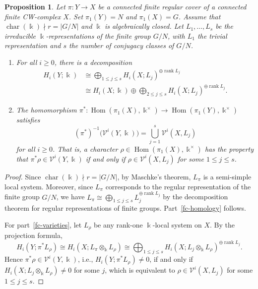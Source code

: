 \documentclass[11pt]{amsart}
\newtheorem{proposition}[theorem]{Proposition}
\theoremstyle{definition}
\renewcommand{\k}{\Bbbk}
\newcommand{\VV}{\mathcal{V}}
\DeclareMathOperator{\rank}{rank}
\DeclareMathOperator{\ch}{char}
\DeclareMathOperator{\Hom}{{Hom}}
\begin{document}
\begin{proposition} 
\label{prop:finite-cover}
Let $\pi\colon Y\to X$ be a connected finite regular cover of a connected 
finite CW-complex $X$. Set $\pi_1(Y)=N$ and $\pi_1(X)=G$.
Assume that $\ch(\k) \nmid r=\vert G/N \vert$ and $\k$ is algebraically closed. 
Let $L_1,\dots, L_s$ be the irreducible $\k$-representations of the 
finite group $G/N$, with $L_1$ the trivial representation and $s$ the 
number of conjugacy classes of $G/N$.
\begin{enumerate}[itemsep=3pt]
\item \label{fc-homology}
For all $i\ge 0$, there is a decomposition
\begin{equation}
\label{eq:decomp}
\begin{aligned}
H_i(Y;\k) & \cong \bigoplus_{1\leq j \leq s}  
H_i(X;L_j)^{\oplus \rank L_j} \\
& \cong H_i(X;\k) \oplus \bigoplus_{2\leq j \leq s}
H_i(X;L_j)^{\oplus \rank L_j}.
\end{aligned}
\end{equation}

\item \label{fc-varieties}
The homomorphism $\pi^* \colon \Hom(\pi_1(X),\k^{\times})\to 
\Hom(\pi_1(Y),\k^{\times})$ satisfies
\begin{equation}
\label{eq:pullback-cv}
(\pi^*)^{-1}\big(\VV^i(Y,\k)\big) 
= \bigcup_{j=1}^{s} \VV^i(X,L_j)
\end{equation}
for all $i\ge 0$. That is, a character 
$\rho\in \Hom(\pi_1(X),\k^{\times})$ has the property that 
$\pi^*\rho \in \VV^i(Y,\k)$ if and only if 
$\rho \in \VV^i(X,L_j)$ for some $1\le j\le s$.
\end{enumerate}
\end{proposition}

\begin{proof}
Since $\ch(\k) \nmid r=\vert G/N \vert$, by Maschke's theorem, 
$L_{\pi}$ is a semi-simple local system. 
Moreover, since $L_\pi$ corresponds to the regular representation 
of the finite group $G/N$, we have $L_\pi \cong 
\bigoplus_{1\leq j \leq s} L_j^{\oplus \rank L_j}$ by the 
decomposition theorem for regular representations of 
finite groups. Part~\eqref{fc-homology} follows.

For part~\eqref{fc-varieties}, let $L_\rho$ be any rank-one 
$\k$-local system on $X$. By the projection formula, 
\begin{equation}
\label{eq:proj-formula}
H_i(Y; \pi^*L_\rho) \cong H_i(X; L_\pi \otimes_\k L_\rho)
\cong \bigoplus_{1\leq j \leq s} 
H_i(X;L_j\otimes_\k L_\rho)^{\oplus \rank L_j}.
\end{equation}
Hence $\pi^*\rho \in \VV^i(Y,\k)$, i.e., 
$H_i(Y;\pi^*L_\rho)\ne 0$, if and only if 
$H_i(X;L_j\otimes_\k L_\rho)\ne 0$ for some $j$, 
which is equivalent to $\rho \in \VV^i(X,L_j)$ 
for some $1\le j\le s$.
\end{proof}
\end{document}

